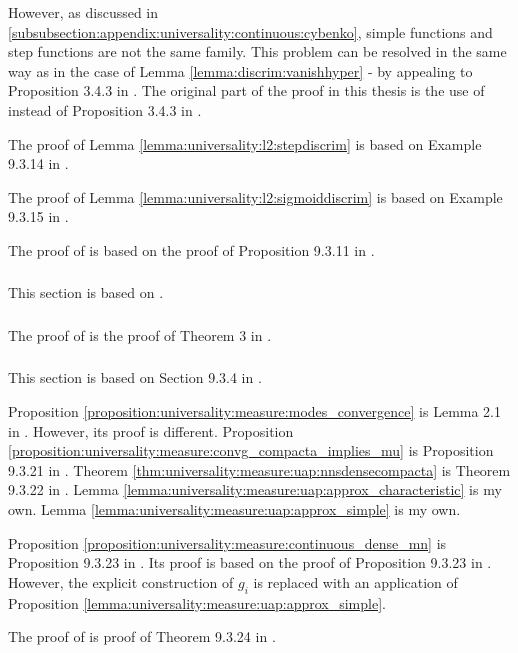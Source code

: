 However, as discussed in \ref{subsubsection:appendix:universality:continuous:cybenko}, simple functions and step functions are not the same family. This problem can be resolved in the same way as in the case of Lemma \ref{lemma:discrim:vanishhyper} - by appealing to Proposition 3.4.3 in \cite{cohn_2013_measure}. The original part of the proof in this thesis is the use of  instead of Proposition 3.4.3 in \cite{cohn_2013_measure}.

The proof of Lemma \ref{lemma:universality:l2:stepdiscrim} is based on Example 9.3.14 in \cite{calin_2020_deep}.

The proof of Lemma \ref{lemma:universality:l2:sigmoiddiscrim} is based on Example 9.3.15 in \cite{calin_2020_deep}.

The proof of  is based on the proof of Proposition 9.3.11 in \cite{calin_2020_deep}.

\subsubsection{}
This section is based on .

\subsubsection{}

The proof of  is the proof of Theorem 3 in \cite{cybenko_1989_approximation}.

\subsubsection{}

This section is based on Section 9.3.4 in \cite{calin_2020_deep}.

Proposition \ref{proposition:universality:measure:modes_convergence} is Lemma 2.1 in \cite{hornik}. However, its proof is different.
Proposition \ref{proposition:universality:measure:convg_compacta_implies_mu} is Proposition 9.3.21 in \cite{calin_2020_deep}.
Theorem \ref{thm:universality:measure:uap:nnsdensecompacta} is Theorem 9.3.22 in \cite{calin_2020_deep}.
Lemma \ref{lemma:universality:measure:uap:approx_characteristic} is my own.
Lemma \ref{lemma:universality:measure:uap:approx_simple} is my own.

Proposition \ref{proposition:universality:measure:continuous_dense_mn} is Proposition 9.3.23 in \cite{calin_2020_deep}. Its proof is based on the proof of Proposition 9.3.23 in \cite{calin_2020_deep}. However, the explicit construction of $g_i$ is replaced with an application of Proposition  \ref{lemma:universality:measure:uap:approx_simple}.

The proof of  is proof of Theorem 9.3.24 in \cite{calin_2020_deep}.